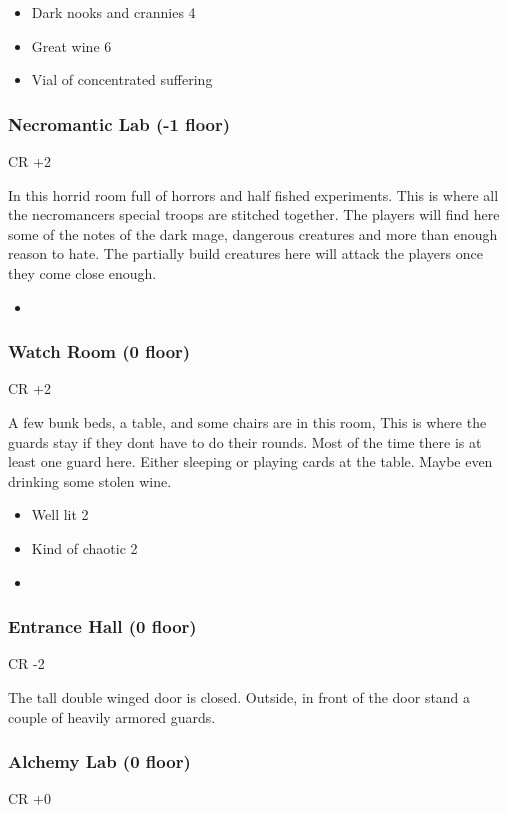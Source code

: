 \documentclass[11pt]{article}
\begin{document}
{\begin{itemize}
\item Dark nooks and crannies 4
\item Great wine 6
\item Vial of concentrated suffering
\end{itemize}
\subsubsection{Necromantic Lab (-1 floor)}
\label{sec:org13ba7a5}
CR +2

In this horrid room full of horrors and half fished experiments. This is where all the necromancers special troops are stitched together. The players will find here some of the notes of the dark mage, dangerous creatures and more than enough reason to hate. The partially build creatures here will attack the players once they come close enough.

\begin{itemize}
\item 
\end{itemize}
\subsubsection{Watch Room (0 floor)}
\label{sec:org0141d9f}
CR +2

A few bunk beds, a table, and some chairs are in this room, This is where the guards stay if they dont have to do their rounds. Most of the time there is at least one guard here. Either sleeping or playing cards at the table. Maybe even drinking some stolen wine.

\begin{itemize}
\item Well lit 2
\item Kind of chaotic 2
\item 
\end{itemize}
\subsubsection{Entrance Hall (0 floor)}
\label{sec:org02d2f05}
CR -2

The tall double winged door is closed. Outside, in front of the door stand a couple of heavily armored guards.
\subsubsection{Alchemy Lab (0 floor)}
\label{sec:org617f85b}
CR +0

}
\end{document}
